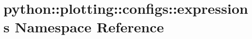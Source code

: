\hypertarget{namespacepython_1_1plotting_1_1configs_1_1expressions}{
\section{python::plotting::configs::expressions Namespace Reference}
\label{namespacepython_1_1plotting_1_1configs_1_1expressions}
}
